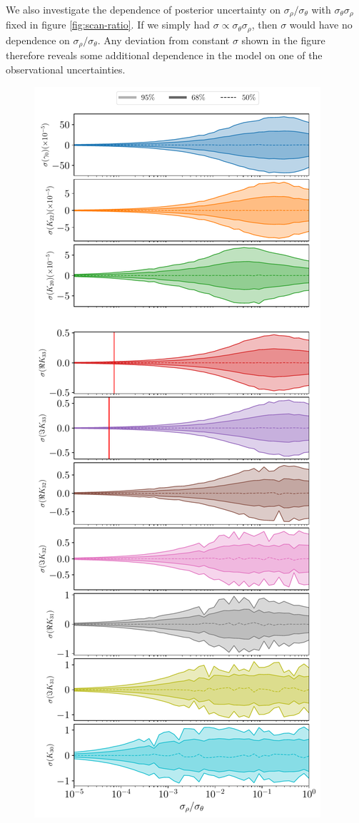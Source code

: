 \documentclass[fleqn,usenatbib]{mnras}
\begin{document}
We also investigate the dependence of posterior uncertainty on $\sigma_\rho / \sigma_\theta$ with $\sigma_\theta \sigma_\rho$ fixed in figure \ref{fig:scan-ratio}. If we simply had $\sigma \propto \sigma_\theta \sigma_\rho$, then $\sigma$ would have no dependence on $\sigma_\rho / \sigma_\theta$. Any deviation from constant $\sigma$ shown in the figure therefore reveals some additional dependence in the model on one of the observational uncertainties.

\begin{figure}
  \centering
  \includegraphics[height=0.89\textheight]{figs/scan-ratio.pdf}

\end{figure}
\end{document}

